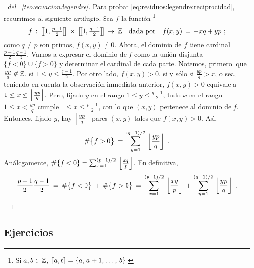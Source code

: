 \begin{proof}[\proofname~del \teoname~\ref{teo:ecuacion:legendre}]
	Para probar \eqref{eq:residuos:legendre:reciprocidad},
	recurrimos al siguiente artilugio. Sea $f$ la funci\'on%
	\footnote{
		Si $a,b\in\mathbb{Z}$, $\left[\!\left[a,b\right]\!\right]=\{a,\,a+1,\,\dots,\,b\}$.
	}
	\begin{displaymath}
		f\,:\,\left[\!\left[1,\tfrac{p-1} 2\right]\!\right]\,\times\,
			\left[\!\left[1,\tfrac{q-1} 2\right]\!\right]\,\rightarrow\,
			\mathbb{Z}
		\quad\text{dada por}\quad
		f(x,y)\,=\,-xq+yp
		\text{ ;}
	\end{displaymath}
	como $q\neq p$ son primos, $f(x,y)\neq 0$.
	Ahora, el dominio de $f$ tiene cardinal $\frac{p-1} 2\frac{q-1} 2$.
	Vamos a expresar el dominio de $f$ como la uni\'on disjunta
	$\{f<0\}\cup\{f>0\}$ y determinar el cardinal de cada parte.
	Notemos, primero, que $\frac{yp} q\not\in\mathbb{Z}$, si
	$1\leq y\leq\frac{q-1} 2$. Por otro lado, $f(x,y)>0$, si y s\'olo
	si $\frac{yp} q>x$, o sea, teniendo en cuenta la observaci\'on
	inmediata anterior, $f(x,y)>0$ equivale a
	$1\leq x\leq \left\lfloor{\frac{yp} q}\right\rfloor$. Pero, fijado $y$ en el rango
	$1\leq y\leq\frac{q-1} 2$, todo $x$ en el rango $1\leq x<\frac{yp} q$
	cumple $1\leq x\leq\frac{p-1} 2$, con lo que $(x,y)$ pertenece al
	dominio de $f$. Entonces, fijado $y$, hay $\left\lfloor{\frac{yp} q}\right\rfloor$ pares
	$(x,y)$ tales que $f(x,y)>0$. As\'{\i},
	\begin{displaymath}
		\#{\big\{f>0\big\}}\,=\,\sum_{y=1}^{(q-1)/2}\,
			\left\lfloor{\frac{yp} q}\right\rfloor
		\text{ .}
	\end{displaymath}
	An\'alogamente,
	\begin{math}
		\#{\{f<0\}}=\sum_{x=1}^{(p-1)/2}\,\left\lfloor{\frac{xq} p}\right\rfloor
	\end{math}.
	En definitiva,
	\begin{displaymath}
		\frac{p-1} 2\frac{q-1} 2\,=\,
		\#{\big\{f<0\big\}}\,+\,
			\#{\big\{f>0\big\}}\,=\,
			\sum_{x=1}^{(p-1)/2}\,\left\lfloor{\frac{xq} p}\right\rfloor\,+\,
			\sum_{y=1}^{(q-1)/2}\,\left\lfloor{\frac{yp} q}\right\rfloor
		\text{ .}
	\end{displaymath}
\end{proof}

\subsection*{Ejercicios}



